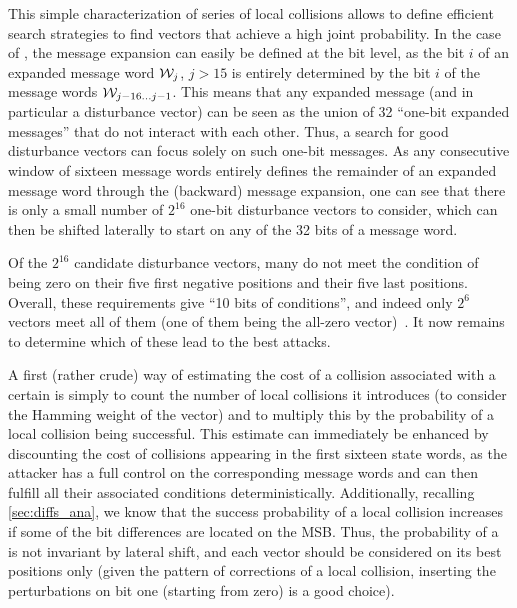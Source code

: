 This simple characterization of series of local collisions allows to define efficient search strategies to find vectors
that achieve a high joint probability.
In the case of \shazero, the message expansion can easily be defined at the bit level, as the bit $i$ of an expanded message word $\mathcal{W}_j$, $j > 15$ is entirely determined by the bit $i$
of the message words $\mathcal{W}_{j-16\ldots j-1}$. This means that any expanded message (and in particular a disturbance vector) can be seen as the union of 32 ``one-bit expanded messages'' that
do not interact with each other. Thus, a search for good disturbance vectors can focus solely on such one-bit messages. As any consecutive window of sixteen message words entirely
defines the remainder of an expanded message word through the (backward) message expansion, one can see that there is only a small number of $2^{16}$ one-bit disturbance vectors to consider, which
can then be shifted laterally to start on any of the 32 bits of a message word.

Of the $2^{16}$ candidate disturbance vectors, many do not meet the condition of being zero on their five first negative positions and their five last positions. Overall, these requirements give
``10 bits of conditions'', and indeed only $2^6$ vectors meet all of them (one of them being the all-zero vector)~\cite[Chapter 5]{algocrypt}. It now remains to determine which of these lead
to the best attacks.

\medskip

A first (rather crude) way of estimating the cost of a collision associated with a certain \dv is simply to count the number of local collisions it introduces (\ie to consider the Hamming weight
of the vector) and to multiply this by the probability of a local collision being successful. This estimate can immediately be enhanced by discounting the cost of collisions appearing in the
first sixteen state words, as the attacker has a full control on the corresponding message words and can then fulfill all their associated conditions deterministically. Additionally, recalling
\autoref{sec:diffs_ana}, we know that the success probability of a local collision increases if some of the bit differences are located on the MSB. Thus, the probability of a \dv is not
invariant by lateral shift, and each vector should be considered on its best positions only (given the pattern of corrections of a local collision, inserting the perturbations on
bit one (starting from zero) is a good choice).

